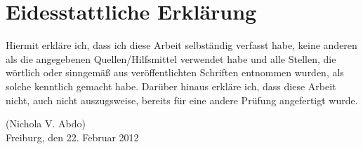 
\chapter*{Eidesstattliche Erklärung}
\thispagestyle{empty}
\vspace{2cm}

Hiermit erkläre ich, dass ich diese Arbeit selbständig verfasst habe, keine anderen als die angegebenen Quellen/Hilfsmittel verwendet habe und alle Stellen, die wörtlich oder sinngemäß aus veröffentlichten Schriften entnommen wurden, als solche kenntlich gemacht habe. Darüber hinaus erkläre ich, dass diese Arbeit nicht, auch nicht auszugsweise, bereits für eine andere Prüfung angefertigt wurde.\\

\vspace{2cm}

\noindent (Nichola V. Abdo)\\
Freiburg, den 22. Februar 2012



